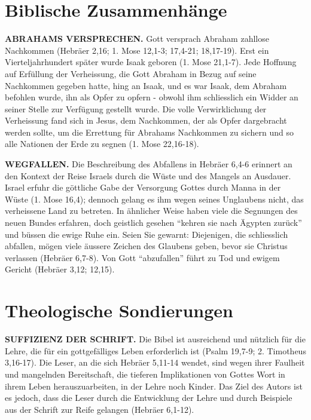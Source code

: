 \documentclass[headsepline=true]{book}
\begin{document}
\section{Biblische Zusammenhänge}\label{biblische-zusammenhuxe4nge-4}

\textbf{ABRAHAMS VERSPRECHEN.} Gott versprach Abraham zahllose
Nachkommen (Hebräer 2,16; 1. Mose 12,1-3; 17,4-21; 18,17-19). Erst ein
Vierteljahrhundert später wurde Isaak geboren (1. Mose 21,1-7). Jede
Hoffnung auf Erfüllung der Verheissung, die Gott Abraham in Bezug auf
seine Nachkommen gegeben hatte, hing an Isaak, und es war Isaak, dem
Abraham befohlen wurde, ihn als Opfer zu opfern - obwohl ihm
schliesslich ein Widder an seiner Stelle zur Verfügung gestellt wurde.
Die volle Verwirklichung der Verheissung fand sich in Jesus, dem
Nachkommen, der als Opfer dargebracht werden sollte, um die Errettung
für Abrahams Nachkommen zu sichern und so alle Nationen der Erde zu
segnen (1. Mose 22,16-18).

\textbf{WEGFALLEN.} Die Beschreibung des Abfallens in Hebräer 6,4-6
erinnert an den Kontext der Reise Israels durch die Wüste und des
Mangels an Ausdauer. Israel erfuhr die göttliche Gabe der Versorgung
Gottes durch Manna in der Wüste (1. Mose 16,4); dennoch gelang es ihm
wegen seines Unglaubens nicht, das verheissene Land zu betreten. In
ähnlicher Weise haben viele die Segnungen des neuen Bundes erfahren,
doch geistlich gesehen ``kehren sie nach Ägypten zurück'' und büssen die
ewige Ruhe ein. Seien Sie gewarnt: Diejenigen, die schliesslich
abfallen, mögen viele äussere Zeichen des Glaubens geben, bevor sie
Christus verlassen (Hebräer 6,7-8). Von Gott ``abzufallen'' führt zu Tod
und ewigem Gericht (Hebräer 3,12; 12,15).

\section{Theologische Sondierungen}\label{theologische-sondierungen-2}

\textbf{SUFFIZIENZ DER SCHRIFT.} Die Bibel ist ausreichend und nützlich
für die Lehre, die für ein gottgefälliges Leben erforderlich ist (Psalm
19,7-9; 2. Timotheus 3,16-17). Die Leser, an die sich Hebräer 5,11-14
wendet, sind wegen ihrer Faulheit und mangelnden Bereitschaft, die
tieferen Implikationen von Gottes Wort in ihrem Leben herauszuarbeiten,
in der Lehre noch Kinder. Das Ziel des Autors ist es jedoch, dass die
Leser durch die Entwicklung der Lehre und durch Beispiele aus der
Schrift zur Reife gelangen (Hebräer 6,1-12).
\end{document}
